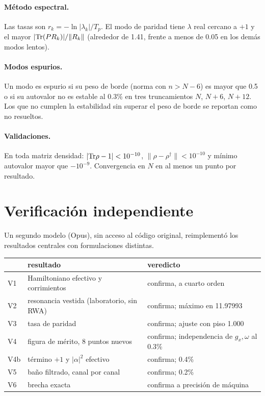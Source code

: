 \documentclass[11pt]{report}
\begin{document}
\paragraph{M\'etodo espectral.} Las tasas son $r_{k}=-\ln|\lambda_{k}|/T_{p}$. El modo de paridad tiene $\lambda$ real cercano a $+1$ y el mayor $|{\rm Tr}(PR_{k})|/\|R_{k}\|$ (alrededor de 1.41, frente a menos de 0.05 en los dem\'as modos lentos).

\paragraph{Modos espurios.} Un modo es espurio si su peso de borde (norma con $n>N-6$) es mayor que 0.5 o si su autovalor no es estable al 0.3\% en tres truncamientos $N$, $N+6$, $N+12$. Los que no cumplen la estabilidad sin superar el peso de borde se reportan como no resueltos.

\paragraph{Validaciones.} En toda matriz densidad: $|{\rm Tr}\rho-1|<10^{-10}$, $\|\rho-\rho^{\dagger}\|<10^{-10}$ y m\'inimo autovalor mayor que $-10^{-9}$. Convergencia en $N$ en al menos un punto por resultado.

\section{Verificaci\'on independiente}

Un segundo modelo (Opus), sin acceso al c\'odigo original, reimplement\'o los resultados centrales con formulaciones distintas.

\begin{table}[h]
\centering
\begin{tabular}{lll}
\toprule
& resultado & veredicto\\
\midrule
V1 & Hamiltoniano efectivo y corrimientos & confirma, a cuarto orden\\
V2 & resonancia vestida (laboratorio, sin RWA) & confirma; m\'aximo en 11.97993\\
V3 & tasa de paridad & confirma; ajuste con piso 1.000\\
V4 & figura de m\'erito, 8 puntos nuevos & confirma; independencia de $g_{x},\omega$ al 0.3\%\\
V4b & t\'ermino $+1$ y $|\alpha|^{2}$ efectivo & confirma; 0.4\%\\
V5 & baño filtrado, canal por canal & confirma; 0.2\%\\
V6 & brecha exacta & confirma a precisi\'on de m\'aquina\\
\bottomrule
\end{tabular}
\end{table}
\end{document}
